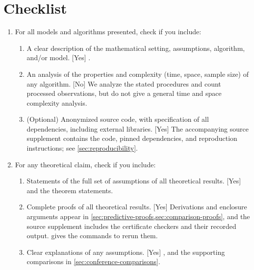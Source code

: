 \section*{Checklist}

\begin{enumerate}
      \item For all models and algorithms presented, check if you include:
            \begin{enumerate}
                  \item A clear description of the mathematical setting,
                        assumptions, algorithm, and/or model. [Yes]
                        .
                  \item An analysis of the properties and complexity (time,
                        space, sample size) of any algorithm. [No] We analyze
                        the stated procedures and count processed observations,
                        but do not give a general time and space complexity
                        analysis.
                  \item (Optional) Anonymized source code, with specification of
                        all dependencies, including external libraries. [Yes]
                        The accompanying source supplement contains the code,
                        pinned dependencies, and reproduction instructions;
                        see \cref{sec:reproducibility}.
            \end{enumerate}

      \item For any theoretical claim, check if you include:
            \begin{enumerate}
                  \item Statements of the full set of assumptions of all
                        theoretical results. [Yes] 
                        and the theorem statements.
                  \item Complete proofs of all theoretical results. [Yes]
                        Derivations and enclosure arguments appear in
                        \cref{sec:predictive-proofs,sec:comparison-proofs}, and
                        the source supplement includes the certificate checkers
                        and their recorded output. 
                        gives the commands to rerun them.
                  \item Clear explanations of any assumptions. [Yes]
                        ,
                        and the supporting comparisons in
                        \cref{sec:conference-comparisons}.
            \end{enumerate}


\end{enumerate}
